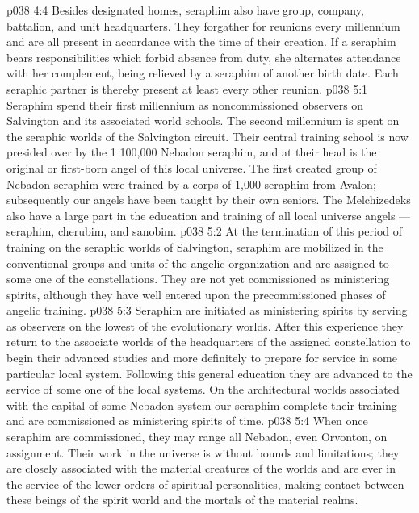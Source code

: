 \vs p038 4:4 Besides designated homes, seraphim also have group, company, battalion, and unit headquarters. They forgather for reunions every millennium and are all present in accordance with the time of their creation. If a seraphim bears responsibilities which forbid absence from duty, she alternates attendance with her complement, being relieved by a seraphim of another birth date. Each seraphic partner is thereby present at least every other reunion.
\vs p038 5:1 Seraphim spend their first millennium as noncommissioned observers on Salvington and its associated world schools. The second millennium is spent on the seraphic worlds of the Salvington circuit. Their central training school is now presided over by the 1 100,000 Nebadon seraphim, and at their head is the original or first\hyp{}born angel of this local universe. The first created group of Nebadon seraphim were trained by a corps of 1,000 seraphim from Avalon; subsequently our angels have been taught by their own seniors. The Melchizedeks also have a large part in the education and training of all local universe angels --- seraphim, cherubim, and sanobim.
\vs p038 5:2 At the termination of this period of training on the seraphic worlds of Salvington, seraphim are mobilized in the conventional groups and units of the angelic organization and are assigned to some one of the constellations. They are not yet commissioned as ministering spirits, although they have well entered upon the precommissioned phases of angelic training.
\vs p038 5:3 Seraphim are initiated as ministering spirits by serving as observers on the lowest of the evolutionary worlds. After this experience they return to the associate worlds of the headquarters of the assigned constellation to begin their advanced studies and more definitely to prepare for service in some particular local system. Following this general education they are advanced to the service of some one of the local systems. On the architectural worlds associated with the capital of some Nebadon system our seraphim complete their training and are commissioned as ministering spirits of time.
\vs p038 5:4 When once seraphim are commissioned, they may range all Nebadon, even Orvonton, on assignment. Their work in the universe is without bounds and limitations; they are closely associated with the material creatures of the worlds and are ever in the service of the lower orders of spiritual personalities, making contact between these beings of the spirit world and the mortals of the material realms.
